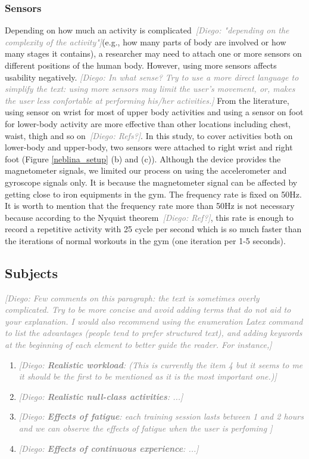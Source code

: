 \documentclass[journal,article,submit,moreauthors,pdftex]{Definitions/mdpi}
\newcommand{\diego}[1]{\textcolor{gray}{{\it [Diego: #1]}}}
\begin{document}
\subsubsection{Sensors} 
Depending on how much an activity is complicated~\diego{"depending on the complexity of the activity"}(e.g., how many parts of body are involved or how many stages it contains), a researcher may need to attach one or more sensors on different positions of the human body. However, using more sensors affects usability negatively. \diego{In what sense? Try to use a more direct language to simplify the text: using more sensors may limit the user's movement, or, makes the user less confortable at performing his/her activities.}
From the literature, using sensor on wrist for most of upper body activities and using a sensor on foot for lower-body activity are more effective than other locations including chest, waist, thigh and so on~\diego{Refs?}. In this study, to cover activities both on lower-body and upper-body, two sensors were attached to right wrist and right foot (Figure \ref{neblina_setup} (b) and (c)). Although the device provides the magnetometer signals, we limited our process on using the accelerometer and gyroscope signals only. It is because the magnetometer signal can be affected by getting close to iron equipments in the gym. The frequency rate is fixed on 50Hz. It is worth to mention that the frequency rate more than 50Hz is not necessary because according to the Nyquist theorem~\diego{Ref?}, this rate is enough to record a repetitive activity with 25 cycle per second which is so much faster than the iterations of normal workouts in the gym (one iteration per 1-5 seconds).\\
\subsection{Subjects}
\diego{Few comments on this paragraph: the text is sometimes overly complicated. Try to be more concise and avoid adding terms that do not aid to your explanation. I would also recommend using the enumeration Latex command to list the advantages (people tend to prefer structured text), and adding keywords at the beginning of each element to better guide the reader. For instance,}


\begin{enumerate}
	
	\item \diego{\textbf{Realistic workload}: (This is currently the item 4 but it seems to me it should be the first to be mentioned as it is the most important one.)}
	
	\item \diego{\textbf{Realistic null-class activities}: ...} 	
	
	\item \diego{\textbf{Effects of fatigue}: each training session lasts between 1 and 2 hours and we can observe the effects of fatigue when the user is perfoming  }
	
	\item \diego{\textbf{Effects of continuous experience}: ...}
\end{enumerate}
\end{document}
